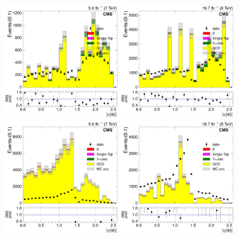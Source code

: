 \begin{figure}[hbtp]
    \centering
      \includegraphics[width=0.45\textwidth]{Chapters/04_Analysis/04b_XSections/images/control_plots/before_fit/7TeV/qcd_plots/QCD_electron_AbsEta_conversion_control_region_0btag_with_ratio}\hfill
      \includegraphics[width=0.45\textwidth]{Chapters/04_Analysis/04b_XSections/images/control_plots/before_fit/8TeV/qcd_plots/QCD_electron_AbsEta_conversion_control_region_0btag_with_ratio}\\
      \includegraphics[width=0.45\textwidth]{Chapters/04_Analysis/04b_XSections/images/control_plots/before_fit/7TeV/qcd_plots/QCD_electron_AbsEta_non_iso_control_region_0btag_with_ratio}\hfill
      \includegraphics[width=0.45\textwidth]{Chapters/04_Analysis/04b_XSections/images/control_plots/before_fit/8TeV/qcd_plots/QCD_electron_AbsEta_non_iso_control_region_0btag_with_ratio}\\

\end{figure}
